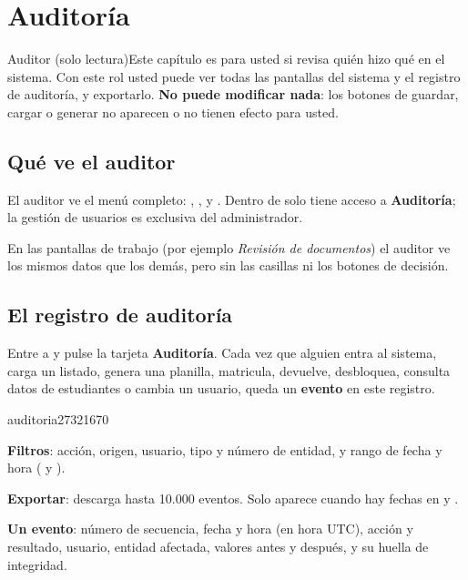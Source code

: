 \chapter{Auditoría}\label{cap:auditoria}

\begin{ficharol}{Auditor (solo lectura)}{Este capítulo es para usted si revisa quién hizo
  qué en el sistema.}
Con este rol usted puede ver todas las pantallas del sistema y el registro de auditoría, y
exportarlo. \textbf{No puede modificar nada}: los botones de guardar, cargar o generar no
aparecen o no tienen efecto para usted.
\end{ficharol}

\section{Qué ve el auditor}

El auditor ve el menú completo: , ,  y
. Dentro de  solo tiene acceso a \textbf{Auditoría};
la gestión de usuarios es exclusiva del administrador.

En las pantallas de trabajo (por ejemplo \emph{Revisión de documentos}) el auditor ve los
mismos datos que los demás, pero sin las casillas ni los botones de decisión.

\section{El registro de auditoría}

Entre a  y pulse la tarjeta \textbf{Auditoría}. Cada vez que alguien entra
al sistema, carga un listado, genera una planilla, matricula, devuelve, desbloquea, consulta
datos de estudiantes o cambia un usuario, queda un \textbf{evento} en este registro.

\begin{captura}{auditoria}{2732}{1670}
\end{captura}

\begin{leyenda}
  \item[1] \textbf{Filtros}: acción, origen, usuario, tipo y número de entidad, y rango de
        fecha y hora ( y ).
  \item[2] \textbf{Exportar}: descarga hasta 10.000 eventos. Solo aparece cuando hay fechas en
         y .
  \item[3] \textbf{Un evento}: número de secuencia, fecha y hora (en hora UTC), acción y
        resultado, usuario, entidad afectada, valores antes y después, y su huella de
        integridad.
\end{leyenda}

